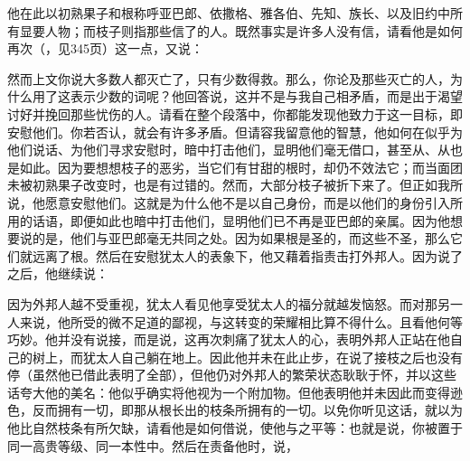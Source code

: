 \par

他在此以初熟果子和根称呼亚巴郎、依撒格、雅各伯、先知、族长、以及旧约中所有显要人物；而枝子则指那些信了的人。既然事实是许多人没有信，请看他是如何再次（，见345页）这一点，又说：\par

\par

然而上文你说大多数人都灭亡了，只有少数得救。那么，你论及那些灭亡的人，为什么用了这表示少数的词呢？他回答说，这并不是与我自己相矛盾，而是出于渴望讨好并挽回那些忧伤的人。请看在整个段落中，你都能发现他致力于这一目标，即安慰他们。你若否认，就会有许多矛盾。但请容我留意他的智慧，他如何在似乎为他们说话、为他们寻求安慰时，暗中打击他们，显明他们毫无借口，甚至从、从也是如此。因为要想想枝子的恶劣，当它们有甘甜的根时，却仍不效法它；而当面团未被初熟果子改变时，也是有过错的。然而，大部分枝子被折下来了。但正如我所说，他愿意安慰他们。这就是为什么他不是以自己身份，而是以他们的身份引入所用的话语，即便如此也暗中打击他们，显明他们已不再是亚巴郎的亲属。因为他想要说的是，他们与亚巴郎毫无共同之处。因为如果根是圣的，而这些不圣，那么它们就远离了根。然后在安慰犹太人的表象下，他又藉着指责击打外邦人。因为说了之后，他继续说：\par

\par

因为外邦人越不受重视，犹太人看见他享受犹太人的福分就越发恼怒。而对那另一人来说，他所受的微不足道的鄙视，与这转变的荣耀相比算不得什么。且看他何等巧妙。他并没有说接，而是说，这再次刺痛了犹太人的心，表明外邦人正站在他自己的树上，而犹太人自己躺在地上。因此他并未在此止步，在说了接枝之后也没有停（虽然他已借此表明了全部），但他仍对外邦人的繁荣状态耿耿于怀，并以这些话夸大他的美名：他似乎确实将他视为一个附加物。但他表明他并未因此而变得逊色，反而拥有一切，即那从根长出的枝条所拥有的一切。以免你听见这话，就以为他比自然枝条有所欠缺，请看他是如何借说，使他与之平等：也就是说，你被置于同一高贵等级、同一本性中。然后在责备他时，说，\par

